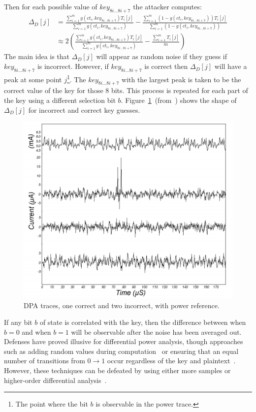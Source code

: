 \documentclass{article}
\begin{document}
Then for each possible value of $key_{8i...8i+7}$ the attacker computes:
\begin{align*}
\Delta_D[j] &= \frac{\sum_{i=1}^m g(ct_i, key_{8i...8i+7})T_i[j]}{\sum_{i=1}^m g(ct_i, key_{8i...8i+7})}
-\frac{\sum_{i=1}^m (1-g(ct_i, key_{8i...8i+7}))T_i[j]}{\sum_{i=1}^m(1- g(ct_i, key_{8i...8i+7}))}\\
&\approx 2\left(  \frac{\sum_{i=1}^m g(ct_i, key_{8i...8i+7})T_i[j]}{\sum_{i=1}^m g(ct_i, key_{8i...8i+7})} - \frac{\sum_{i=1}^m T_i[j]}{m} \right)
\end{align*}
The main idea is that $\Delta_D[j]$ will appear as random noise if they guess if $key_{8i...8i+7}$ is incorrect.  However, if $key_{8i...8i+7}$ is correct then $\Delta_D[j]$ will have a peak at some point $j$\footnote{The point where the bit $b$ is observable in the power trace.}.  The $key_{8i...8i+7}$ with the largest peak is taken to be the correct value of the key for those $8$ bits.  This process is repeated for each part of the key using a different selection bit $b$.  Figure~\ref{fig:dpa trace}~(from~\cite{kocherDPA}) shows the shape of $\Delta_D[j]$ for incorrect and correct key guesses.

\begin{figure}
\includegraphics[scale=.7]{dpaTrace}
\caption{DPA traces, one correct and two incorrect, with power reference.}
\label{fig:dpa trace}
\end{figure}


If any bit $b$ of state is correlated with the key, then the difference between when $b=0$ and when $b=1$ will be observable after the noise has been averaged out.  Defenses have proved illusive for differential power analysis, though approaches such as adding random values during computation~\cite{messergesMasking} or ensuring that an equal number of transitions from $0\rightarrow 1$ occur regardless of the key and plaintext~\cite{poppMangardDualRail}.  However, these techniques can be defeated by using either more samples or higher-order differential analysis~\cite{joyeSecondOrderDPA}.



\end{document}
